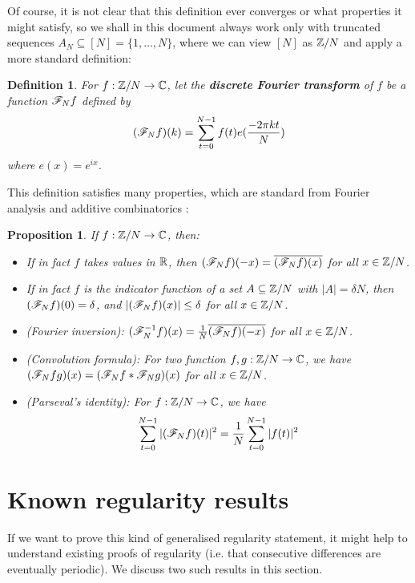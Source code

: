 \documentclass{report}
\newtheorem{proposition}[theorem]{Proposition}
\newtheorem{definition}[theorem]{Definition}
\theoremstyle{remark}
\numberwithin{equation}{section}
\begin{document}
Of course, it is not clear that this definition ever converges or what
properties it might satisfy, so we shall in this document always work
only with truncated sequences $A_N \subseteq [N] = \{1, \ldots, N\}$,
where we can view $[N]$ as $\mathbb{Z}/N$ and apply a more standard
definition:

\begin{definition}
  For $f : \mathbb{Z}/N \to \mathbb{C}$, let the \textbf{discrete Fourier transform}
  of $f$ be a function $\mathscr{F}_N f$ defined by
  \[(\mathscr{F}_N f)(k) = \sum_{t=0}^{N-1} f(t) e(\frac{-2\pi k t}{N})\]
  where $e(x) = e^{ix}$.
\end{definition}

This definition satisfies many properties, which are standard from
Fourier analysis and additive combinatorics \cite{tao:cup2006}:

\begin{proposition}
If $f : \mathbb{Z}/N \to \mathbb{C}$, then: 

\begin{itemize}
\item If in fact $f$ takes values in $\mathbb{R}$, then
  $(\mathscr{F}_N f)(-x) = \overline{(\mathscr{F}_N f)(x)}$ for all $x \in \mathbb{Z}/N$.

\item If in fact $f$ is the indicator function of a set
  $A \subseteq \mathbb{Z}/N$ with $|A| = \delta N$, then
  $(\mathscr{F}_N f)(0) = \delta$, and $|(\mathscr{F}_N f)(x)| \leq \delta$ for all
  $x \in \mathbb{Z}/N$.

\item (Fourier inversion):
  $(\mathscr{F}_N^{-1} f)(x) = \frac{1}{N} \overline{(\mathscr{F}_N f)(-x)}$ for all
  $x \in \mathbb{Z}/N$.

\item (Convolution formula): For two function $f, g : \mathbb{Z}/N \to \mathbb{C}$, we
  have $(\mathscr{F}_N fg)(x) = (\mathscr{F}_N f \ast \mathscr{F}_N g)(x)$ for all
  $x \in \mathbb{Z}/N$.

\item (Parseval's identity): For $f : \mathbb{Z}/N \to \mathbb{C}$, we
  have
  \[\sum_{t=0}^{N-1} |(\mathscr{F}_N f)(t)|^2 = \frac{1}{N} \sum_{t=0}^{N-1}
    |f(t)|^2\]
\end{itemize}
\end{proposition}

\section{Known regularity results}

If we want to prove this kind of generalised regularity statement, it
might help to understand existing proofs of regularity (i.e. that
consecutive differences are eventually periodic).  We discuss two such
results in this section.
\end{document}
